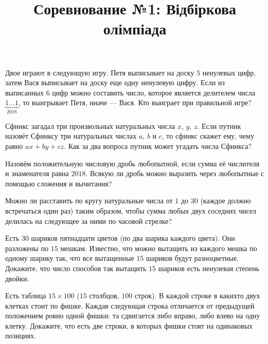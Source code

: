 



\title{Соревнование №1: Відбіркова олімпіада}
\maketitle

\begin{problem}
	Двое играют в следующую игру. Петя выписывает на доску $5$ ненулевых цифр, затем Вася выписывает на доску еще одну ненулевую цифру. Если из выписанных $6$ цифр можно составить число, которое является делителем числа $\underset{2018}{\underbrace{1\ldots1}}$, то выигрывает Петя, иначе --- Вася. Кто выиграет при правильной игре?
\end{problem}

\begin{problem}
	Сфинкс загадал три произвольных натуральных числа $x$, $y$, $z$. Если путник назовёт Сфинксу три натуральных числах $a$, $b$ и $c$, то сфинкс скажет ему, чему равно $ax + by + cz$. Как за два вопроса путник может угадать числа Сфинкса?
\end{problem}

\begin{problem}
	Назовём положительную числовую дробь любопытной, если сумма её числителя и знаменателя равна $2018$. Всякую ли дробь можно выразить через любопытные с помощью сложения и вычитания?
\end{problem}

\begin{problem}
	Можно ли расставить по кругу натуральные числа от $1$ до $30$ (каждое должно встречаться один раз) таким образом, чтобы сумма любых двух соседних чисел делилась на следующее за ними по часовой стрелке?
\end{problem}

\begin{problem}
	Есть $30$ шариков пятнадцати цветов (по два шарика каждого цвета). Они разложены по $15$ мешкам. Известно, что можно вытащить из каждого мешка по одному шарику так, что все вытащенные $15$ шариков будут разноцветные. Докажите, что число способов так вытащить $15$ шариков есть ненулевая степень двойки.
\end{problem}

\begin{problem}
	Есть таблица $15 \times 100$ ($15$ столбцов, $100$ строк). В каждой строке в какихто двух клетках стоит по фишке. Каждая следующая строка отличается от предыдущей положением ровно одной фишки: та сдвигается либо вправо, либо влево на одну клетку. Докажите, что есть две строки, в которых фишки стоят на одинаковых позициях.
\end{problem}


